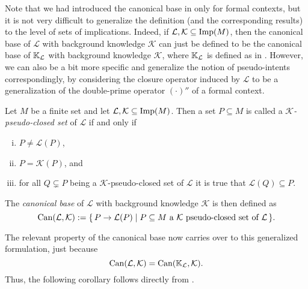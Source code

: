 Note that we had introduced the canonical base in  only for
formal contexts, but it is not very difficult to generalize the definition (and the
corresponding results) to the level of sets of implications.  Indeed, if $\mathcal{L},
\mathcal{K} \subseteq \operatorname{Imp}(M)$, then the canonical base of $\mathcal{L}$ with background
knowledge $\mathcal{K}$ can just be defined to be the canonical base of ${\mathbb{K}}_{\mathcal{L}}$ with background knowledge $\mathcal{K}$, where ${\mathbb{K}}_{\mathcal{L}}$ is
defined as in .  However, we can also be a bit
more specific and generalize the notion of pseudo-intents correspondingly, by considering
the closure operator induced by $\mathcal{L}$ to be a generalization of the double-prime
operator $(\cdot)''$ of a formal context.

\begin{Definition}
  \label{def:pseudo-intents-for-implications}
  Let $M$ be a finite set and let $\mathcal{L}, \mathcal{K} \subseteq \operatorname{Imp}(M)$.  Then a
  set $P \subseteq M$ is called a \emph{$\mathcal{K}$-pseudo-closed set} of $\mathcal{L}$
  if and only if
  \begin{enumerate}[i. ]
  \item $P \neq \mathcal{L}(P)$,
  \item $P = \mathcal{K}(P)$, and
  \item for all $Q \subsetneq P$ being a $\mathcal{K}$-pseudo-closed set of $\mathcal{L}$
    it is true that $\mathcal{L}(Q) \subseteq P$.
  \end{enumerate}
  The \emph{canonical base} of $\mathcal{L}$ with background knowledge $\mathcal{K}$ is
  then defined as
  \begin{equation*}
    \operatorname{Can}(\mathcal{L}, \mathcal{K}) := {\{\, P \to \mathcal{L}(P) \mid P \subseteq M \text{
        a } \mathcal{K} \text{ pseudo-closed set of } \mathcal{L} \,\}}.
  \end{equation*}
\end{Definition}

The relevant property of the canonical base now carries over to this generalized
formulation, just because
\begin{equation*}
  \operatorname{Can}(\mathcal{L}, \mathcal{K}) = \operatorname{Can}({\mathbb{K}}_{\mathcal{L}}, \mathcal{K}).
\end{equation*}
Thus, the following corollary follows directly from
.

